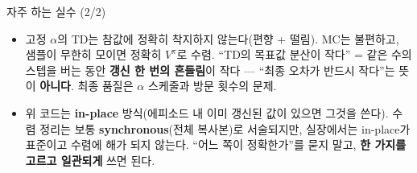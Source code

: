 \begin{frame}{자주 하는 실수 (2/2)}
  \begin{itemize}
    \item {}
      고정 $\alpha$의 TD는 참값에 정확히 착지하지 않는다(편향 + 떨림).
      MC는 불편하고, 샘플이 무한히 모이면 정확히 $V^\pi$로 수렴.
      ``TD의 목표값 분산이 작다'' = 같은 수의 스텝을 버는 동안
      \textbf{갱신 한 번의 흔들림}이 작다 --- ``최종 오차가 반드시 작다''는
      뜻이 \textbf{아니다}. 최종 품질은 $\alpha$ 스케줄과 방문 횟수의 문제.
    \item {}
      위 코드는 \textbf{in-place} 방식(에피소드 내 이미 갱신된 값이 있으면
      그것을 쓴다). 수렴 정리는 보통 \textbf{synchronous}(전체 복사본)로
      서술되지만, 실장에서는 in-place가 표준이고 수렴에 해가 되지 않는다.
      ``어느 쪽이 정확한가''를 묻지 말고, \textbf{한 가지를 고르고
      일관되게} 쓰면 된다.
  \end{itemize}
\end{frame}

